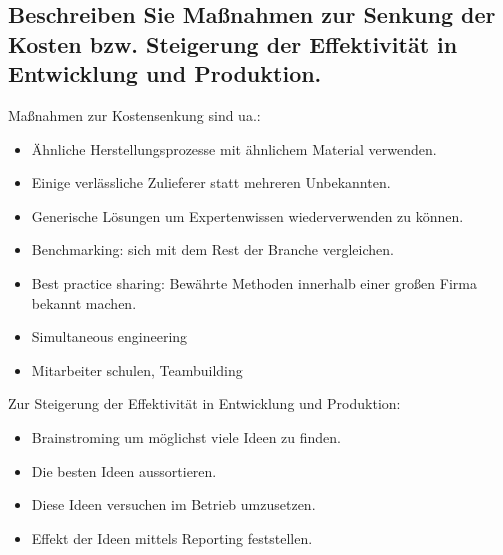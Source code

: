 \subsection{Beschreiben Sie Ma\ss nahmen zur Senkung der Kosten bzw. Steigerung der Effektivit\"at in Entwicklung und Produktion.}
\label{bar}
Ma\ss nahmen zur Kostensenkung sind ua.:
\begin{itemize}
	\item \"Ahnliche Herstellungsprozesse mit \"ahnlichem Material verwenden.
	\item Einige verl\"assliche Zulieferer statt mehreren Unbekannten.
	\item Generische L\"osungen um Expertenwissen wiederverwenden zu k\"onnen.

	\item Benchmarking:
		sich mit dem Rest der Branche vergleichen.
	\item Best practice sharing:
		Bew\"ahrte Methoden innerhalb einer gro\ss en Firma bekannt machen.
	\item Simultaneous engineering

	\item Mitarbeiter schulen, Teambuilding
\end{itemize}

Zur Steigerung der Effektivit\"at in Entwicklung und Produktion:
\begin{itemize}
	\item Brainstroming um m\"oglichst viele Ideen zu finden.
	\item Die besten Ideen aussortieren.
	\item Diese Ideen versuchen im Betrieb umzusetzen.
	\item Effekt der Ideen mittels Reporting feststellen.
\end{itemize}
